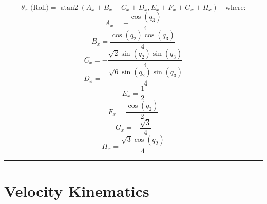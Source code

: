 \documentclass[11pt, a4paper]{article}
\begin{document}
\vspace{1cm}
$$ \theta_x \text{ (Roll)} = \operatorname{atan2}(A_x + B_x + C_x + D_x, E_x + F_x + G_x + H_x) \quad \text{where:}$$
\begin{dmath*} A_x = - \frac{\cos{\left(q_{3} \right)}}{4}\end{dmath*}
\begin{dmath*} B_x = \frac{\cos{\left(q_{2} \right)} \cos{\left(q_{3} \right)}}{4}\end{dmath*}
\begin{dmath*} C_x = - \frac{\sqrt{2} \sin{\left(q_{2} \right)} \sin{\left(q_{3} \right)}}{4}\end{dmath*}
\begin{dmath*} D_x = - \frac{\sqrt{6} \sin{\left(q_{2} \right)} \sin{\left(q_{3} \right)}}{4}\end{dmath*}
\begin{dmath*} E_x = \frac{1}{2}\end{dmath*}
\begin{dmath*} F_x = \frac{\cos{\left(q_{2} \right)}}{2}\end{dmath*}
\begin{dmath*} G_x = - \frac{\sqrt{3}}{4}\end{dmath*}
\begin{dmath*} H_x = \frac{\sqrt{3} \cos{\left(q_{2} \right)}}{4}\end{dmath*}

\hrule

\section*{Velocity Kinematics}
\end{document}
